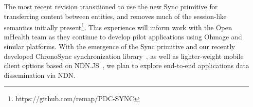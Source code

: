 The most recent revision transitioned to use the
new Sync primitive for transferring content between entities, and removes
much of the session-like semantics initially
present\footnote{https://github.com/remap/PDC-SYNC}. This experience
will inform work with the Open mHealth team as they continue to develop
pilot applications using Ohmage and similar platforms. With the emergence
of the Sync primitive and our recently developed
ChronoSync synchronization library~\cite{Afanasyev13:CHRONOSYNC}, as well as lighter-weight mobile client
options based on NDN.JS~\cite{ndn-js-NOMEN}, we plan to explore end-to-end applications data dissemination via NDN.





